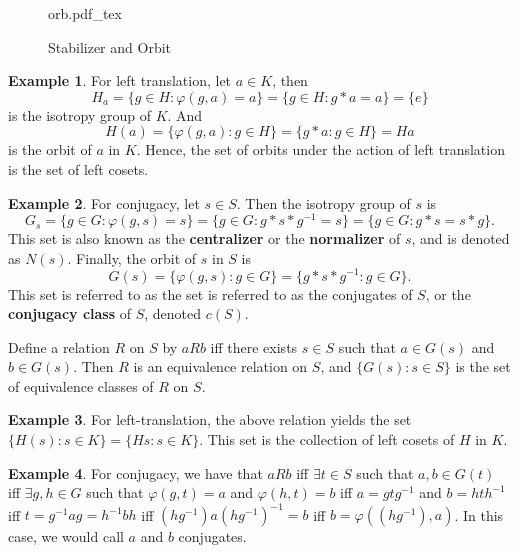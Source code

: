 \documentclass[12pt]{article}
\newcommand{\incfig}[1]{%
    \def\svgwidth{\columnwidth}
    {#1.pdf_tex}
}
\theoremstyle{definition}
\theoremstyle{definition}
\newtheorem{exmp}{Example}[section]
\begin{document}
      \begin{figure}[htp!]
        \centering
          \incfig{orb}
          \caption{Stabilizer and Orbit}
          \label{fig:orb}
      \end{figure}\hfill\par\newpage
      \begin{exmp}
        For left translation, let $a\in K$, then 
          \begin{equation*}
            H_a=\{g\in H:\varphi(g,
            a)=a\}=\{g\in H:g*a=a\}=\{e\}
          \end{equation*}
        is the isotropy group of $K$. And 
          \begin{equation*}
            H(a)=\{\varphi(g, a):g\in H\}=\{g*a:g\in H\}=Ha
          \end{equation*}
        is the orbit of $a$ in $K$. Hence, the set of orbits under the action
        of left translation is the set of left cosets.
      \end{exmp}
      \begin{exmp}
        For conjugacy, let $s\in S$. Then the isotropy group of $s$ is 
          \begin{equation*}
            G_s=\{g\in G:\varphi(g, s)=s\}=\{g\in G:g*s*g^{-1}=s\}=\{g\in
            G:g*s=s*g\}.
          \end{equation*}
        This set is also known as the \textbf{centralizer} or the
        \textbf{normalizer} of $s$, and is denoted as $N(s)$. Finally, the
        orbit of $s$ in $S$ is 
          \begin{equation*}
            G(s)=\{\varphi(g, s):g\in G\}=\{g*s*g^{-1}:g\in G\}.
          \end{equation*}
        This set is referred to as the set is referred to as the conjugates of
        $S$, or the \textbf{conjugacy class} of $S$, denoted $c(S)$.
      \end{exmp}
    Define a relation $R$ on $S$ by $aRb$ iff there exists $s\in S$ such that
    $a\in G(s)$ and $b\in G(s)$. Then $R$ is an equivalence relation on $S$,
    and $\{G(s):s\in S\}$ is the set of equivalence classes of $R$ on $S$.
      \begin{exmp}
        For left-translation, the above relation yields the set $\{H(s):s\in
        K\}=\{Hs:s\in K\}$. This set is the collection of left cosets of $H$ in
        $K$.
      \end{exmp}
      \begin{exmp}
        For conjugacy, we have that $aRb$ iff $\exists t\in S$ such that
        $a, b\in G(t)$ iff $\exists g, h\in G$ such that $\varphi(g, t)=a$ and
        $\varphi(h, t)=b$ iff $a=gtg^{-1}$ and $b=hth^{-1}$ iff
        $t=g^{-1}ag=h^{-1}bh$ iff $(hg^{-1})a(hg^{-1})^{-1}=b$ iff
        $b=\varphi((hg^{-1}), a)$. In this case, we would call $a$ and $b$
        conjugates.
      \end{exmp}
\end{document}
